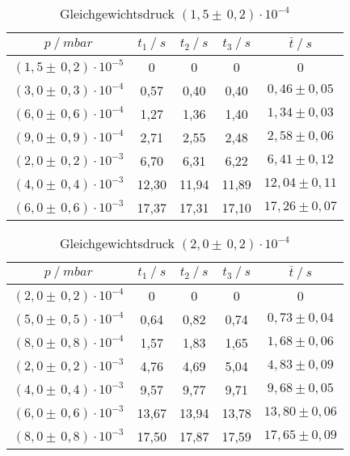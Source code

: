 \begin{table}[H]
\centering
\label{tab:leck_Turbo3}
\begin{tabular}{c|c|c|c|c}
	{$p \:/\: \si{mbar}$} & {$t_1 \:/\: \si{s} $} & {$t_2 \:/\: \si{s} $} & {$t_3 \:/\: \si{s} $} & {$\bar{t} \:/\: \si{s}$}\\
\midrule
$(1,5 \pm \, 0,2)\cdot 10^{-5}$ &0 &0 &0 &0\\
$(3,0 \pm \, 0,3)\cdot 10^{-4}$ &   0,57 &  0,40 &  0,40 & $0,46 \pm 0,05$\\
$(6,0 \pm \, 0,6)\cdot 10^{-4}$ &   1,27  &  1,36 &  1,40 & $1,34 \pm 0,03 $\\
$(9,0 \pm \, 0,9)\cdot 10^{-4}$ &   2,71 &  2,55 &  2,48 & $2,58 \pm 0,06 $\\
$(2,0 \pm \, 0,2)\cdot 10^{-3}$  &   6,70 &  6,31 &  6,22 & $6,41 \pm 0,12 $\\
$(4,0 \pm \, 0,4)\cdot 10^{-3}$ &   12,30 &  11,94 &  11,89 & $12,04 \pm 0,11 $\\
$(6,0 \pm \, 0,6)\cdot 10^{-3}$ &  17,37 & 17,31 & 17,10 & $17,26 \pm 0,07 $\\
\end{tabular}
\caption{Gleichgewichtsdruck $(1,5 \pm \, 0,2)\cdot 10^{-4}$}
\end{table}

\begin{table}[H]
\centering
\label{tab:leck_Turbo4}
\begin{tabular}{c|c|c|c|c}
	{$p \:/\: \si{mbar}$} & {$t_1 \:/\: \si{s} $} & {$t_2 \:/\: \si{s} $} & {$t_3 \:/\: \si{s} $} & {$\bar{t} \:/\: \si{s}$}\\
\midrule
$(2,0 \pm \, 0,2)\cdot 10^{-4}$ &0 &0 &0 &0\\
$(5,0 \pm \, 0,5)\cdot 10^{-4}$ &   0,64 &  0,82 &  0,74 & $0,73 \pm 0,04$\\
$(8,0 \pm \, 0,8)\cdot 10^{-4}$ &   1,57  &  1,83 &  1,65 & $1,68 \pm 0,06 $\\
$(2,0 \pm \, 0,2)\cdot 10^{-3}$ &   4,76 &  4,69 &  5,04 & $4,83 \pm 0,09 $\\
$(4,0 \pm \, 0,4)\cdot 10^{-3}$  &   9,57 &  9,77 &  9,71 & $9,68 \pm 0,05 $\\
$(6,0 \pm \, 0,6)\cdot 10^{-3}$ &   13,67 &  13,94 &  13,78 & $13,80 \pm 0,06 $\\
$(8,0 \pm \, 0,8)\cdot 10^{-3}$ &  17,50 & 17,87 & 17,59 & $17,65 \pm 0,09 $\\
\end{tabular}
\caption{Gleichgewichtsdruck $(2,0 \pm \, 0,2)\cdot 10^{-4}$}
\end{table}


